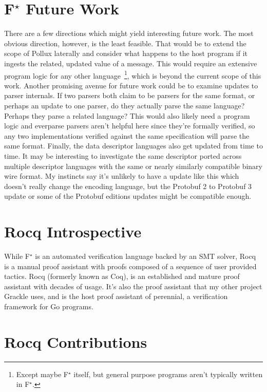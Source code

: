 \documentclass[11pt]{article}
\newcommand{\fstar}{F$^\star$}
\begin{document}
\section{\fstar{} Future Work}

There are a few directions which might yield interesting future work. The most
obvious direction, however, is the least feasible. That would be to extend the
scope of Pollux laterally and consider what happens to the host program if it
ingests the related, updated value of a message. This would require an extensive
program logic for any other language~\footnote{Except maybe \fstar{} itself, but
  general purpose programs aren't typically written in \fstar{}.}, which is
beyond the current scope of this work. Another promising avenue for future work
could be to examine updates to parser internals. If two parsers both claim to be
parsers for the same format, or perhaps an update to one parser, do they
actually parse the same language? Perhaps they parse a related language? This
would also likely need a program logic and everparse parsers aren't helpful here
since they're formally verified, so any two implementations verified against the
same specification will parse the same format. Finally, the data descriptor
languages also get updated from time to time. It may be interesting to
investigate the same descriptor ported across multiple descriptor languages with
the same or nearly similarly compatible binary wire format. My instincts say
it's unlikely to have a update like this which doesn't really change the
encoding language, but the Protobuf 2 to Protobuf 3 update or some of the
Protobuf editions updates might be compatible enough.

\section{Rocq Introspective}

While \fstar{} is an automated verification language backed by an SMT solver,
Rocq is a manual proof assistant with proofs composed of a sequence of user
provided tactics. Rocq (formerly known as Coq), is an established and mature
proof assistant with decades of usage. It's also the proof assistant that my
other project Grackle uses, and is the host proof assistant of perennial, a
verification framework for Go programs.   

\section{Rocq Contributions}
\end{document}
